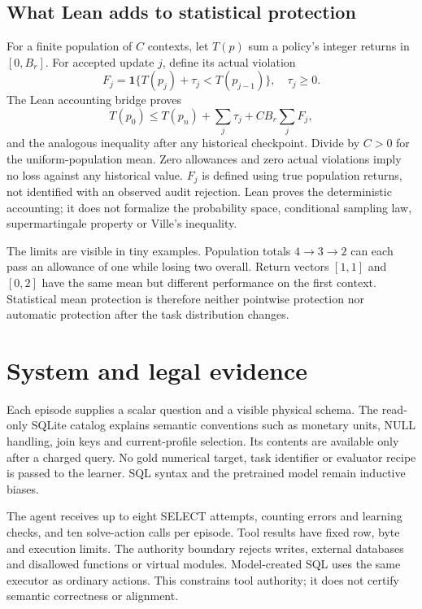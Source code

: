 \documentclass[10pt,twocolumn]{article}
\newcommand{\ind}{\mathbf{1}}
\begin{document}
\subsection{What Lean adds to statistical protection}
For a finite population of $C$ contexts, let $T(p)$ sum a policy's integer
returns in $[0,B_r]$. For accepted update $j$, define its actual violation
\begin{equation}
 F_j=\ind\{T(p_j)+\tau_j<T(p_{j-1})\},\quad\tau_j\geq0.
\end{equation}
The Lean accounting bridge proves
\begin{equation}\label{eq:promotion}
 T(p_0)\leq T(p_n)+\sum_j\tau_j+CB_r\sum_jF_j,
\end{equation}
and the analogous inequality after any historical checkpoint. Divide by $C>0$
for the uniform-population mean. Zero allowances and zero actual violations
imply no loss against any historical value. $F_j$ is defined using true
population returns, not identified with an observed audit rejection. Lean
proves the deterministic accounting; it does not formalize the probability
space, conditional sampling law, supermartingale property or Ville's inequality.

The limits are visible in tiny examples. Population totals $4\to3\to2$ can
each pass an allowance of one while losing two overall. Return vectors
$[1,1]$ and $[0,2]$ have the same mean but different performance on the first
context. Statistical mean protection is therefore neither pointwise protection
nor automatic protection after the task distribution changes.

\section{System and legal evidence}
Each episode supplies a scalar question and a visible physical schema. The
read-only SQLite catalog explains semantic conventions such as monetary units,
NULL handling, join keys and current-profile selection. Its contents are
available only after a charged query. No gold numerical target, task identifier
or evaluator recipe is passed to the learner. SQL syntax and the pretrained
model remain inductive biases.

The agent receives up to eight SELECT attempts, counting errors and learning
checks, and ten solve-action calls per episode. Tool results have fixed row,
byte and execution limits. The authority boundary rejects writes, external
databases and disallowed functions or virtual modules. Model-created SQL uses
the same executor as ordinary actions. This constrains tool authority; it does
not certify semantic correctness or alignment.
\end{document}
